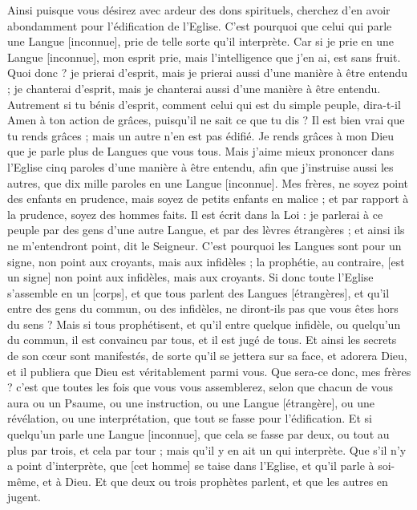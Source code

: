 \begin{multicols}{2}
Ainsi puisque vous désirez avec ardeur des dons spirituels, cherchez d'en avoir abondamment pour l'édification de l'Eglise.
C'est pourquoi que celui qui parle une Langue [inconnue], prie de telle sorte qu'il interprète.
Car si je prie en une Langue [inconnue], mon esprit prie, mais l'intelligence que j'en ai, est sans fruit.
Quoi donc ? je prierai d'esprit, mais je prierai aussi d'une manière à être entendu ; je chanterai d'esprit, mais je chanterai aussi d'une manière à être entendu.
Autrement si tu bénis d'esprit, comment celui qui est du simple peuple, dira-t-il Amen à ton action de grâces, puisqu'il ne sait ce que tu dis ?
Il est bien vrai que tu rends grâces ; mais un autre n'en est pas édifié.
Je rends grâces à mon Dieu que je parle plus de Langues que vous tous.
Mais j'aime mieux prononcer dans l'Eglise cinq paroles d'une manière à être entendu, afin que j'instruise aussi les autres, que dix mille paroles en une Langue [inconnue].
Mes frères, ne soyez point des enfants en prudence, mais soyez de petits enfants en malice ; et par rapport à la prudence, soyez des hommes faits.
Il est écrit dans la Loi : je parlerai à ce peuple par des gens d'une autre Langue, et par des lèvres étrangères ; et ainsi ils ne m'entendront point, dit le Seigneur.
C’est pourquoi les Langues sont pour un signe, non point aux croyants, mais aux infidèles ; la prophétie, au contraire, [est un signe] non point aux infidèles, mais aux croyants.
Si donc toute l'Eglise s'assemble en un [corps], et que tous parlent des Langues [étrangères], et qu'il entre des gens du commun, ou des infidèles, ne diront-ils pas que vous êtes hors du sens ?
Mais si tous prophétisent, et qu'il entre quelque infidèle, ou quelqu'un du commun, il est convaincu par tous, et il est jugé de tous.
Et ainsi les secrets de son cœur sont manifestés, de sorte qu'il se jettera sur sa face, et adorera Dieu, et il publiera que Dieu est véritablement parmi vous.
Que sera-ce donc, mes frères ? c'est que toutes les fois que vous vous assemblerez, selon que chacun de vous aura ou un Psaume, ou une instruction, ou une Langue [étrangère], ou une révélation, ou une interprétation, que tout se fasse pour l'édification.
Et si quelqu'un parle une Langue [inconnue], que cela se fasse par deux, ou tout au plus par trois, et cela par tour ; mais qu'il y en ait un qui interprète.
Que s'il n'y a point d'interprète, que [cet homme] se taise dans l'Eglise, et qu'il parle à soi-même, et à Dieu.
Et que deux ou trois prophètes parlent, et que les autres en jugent.

\end{multicols}
